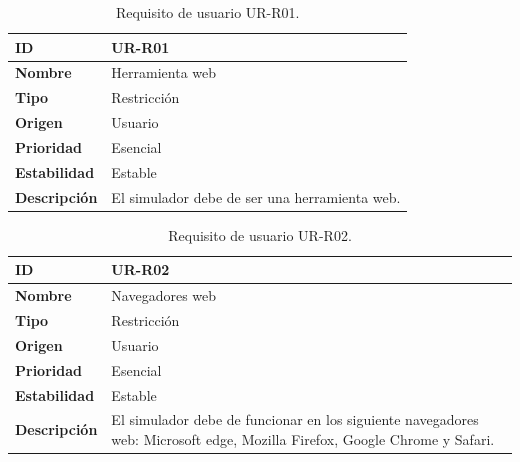 \begin{center}
\begin{table}[htbp]
\centering
\begin{tabular}{@{}p{2.5cm} p{9cm}@{}} 
\toprule
\textbf{ID} 				& UR-R01 \\
\midrule
\textbf{Nombre} 			& Herramienta web\\
\midrule
\textbf{Tipo} 			& Restricción \\
\midrule
\textbf{Origen} 			& Usuario \\
\midrule
\textbf{Prioridad}		& Esencial \\
\midrule
\textbf{Estabilidad} 		& Estable \\
\midrule
\textbf{Descripción} 	& El simulador debe de ser una herramienta web. \\
\bottomrule
\end{tabular}
\caption{Requisito de usuario UR-R01.}
\label{tab:urr01}
\end{table}
\end{center}

\begin{center}
\begin{table}[htbp]
\centering
\begin{tabular}{@{}p{2.5cm} p{9cm}@{}} 
\toprule
\textbf{ID} 				& UR-R02 \\
\midrule
\textbf{Nombre} 			& Navegadores web \\
\midrule
\textbf{Tipo} 			& Restricción \\
\midrule
\textbf{Origen} 			& Usuario \\
\midrule
\textbf{Prioridad}		& Esencial \\
\midrule
\textbf{Estabilidad} 		& Estable \\
\midrule
\textbf{Descripción} 	& El simulador debe de funcionar en los siguiente navegadores web: Microsoft edge, Mozilla Firefox, Google Chrome y Safari. \\
\bottomrule
\end{tabular}
\caption{Requisito de usuario UR-R02.}
\label{tab:urr02}
\end{table}
\end{center}


